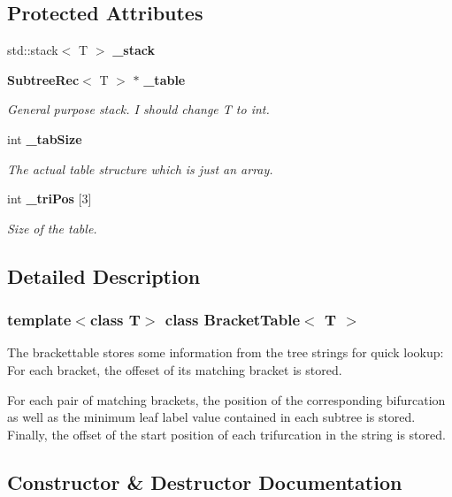 \subsection*{Protected Attributes}
\begin{CompactItemize}
\item 
std::stack$<$ T $>$ {\bf \_\-stack}
\item 
{\bf Subtree\-Rec}$<$ T $>$ $\ast$ {\bf \_\-table}
\begin{CompactList}\small\item\em General purpose stack. I should change T to int. \item\end{CompactList}\item 
int {\bf \_\-tab\-Size}
\begin{CompactList}\small\item\em The actual table structure which is just an array. \item\end{CompactList}\item 
int {\bf \_\-tri\-Pos} [3]
\begin{CompactList}\small\item\em Size of the table. \item\end{CompactList}\end{CompactItemize}


\subsection{Detailed Description}
\subsubsection*{template$<$class T$>$ class Bracket\-Table$<$ T $>$}

The brackettable stores some information from the tree strings for quick lookup: For each bracket, the offeset of its matching bracket is stored. 

For each pair of matching brackets, the position of the corresponding bifurcation as well as the minimum leaf label value contained in each subtree is stored. Finally, the offset of the start position of each trifurcation in the string is stored. 



\subsection{Constructor \& Destructor Documentation}
